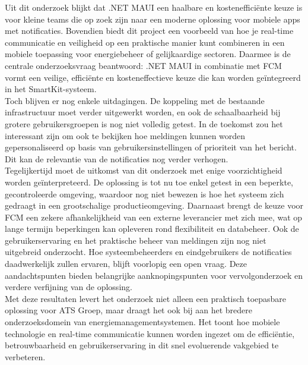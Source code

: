 Uit dit onderzoek blijkt dat .NET MAUI een haalbare en kostenefficiënte keuze is voor kleine teams die op zoek zijn naar een moderne oplossing voor mobiele apps met notificaties. Bovendien biedt dit project een voorbeeld van hoe je real-time communicatie en veiligheid op een praktische manier kunt combineren in een mobiele toepassing voor energiebeheer of gelijkaardige sectoren. Daarmee is de centrale onderzoeksvraag beantwoord: .NET MAUI in combinatie met FCM vormt een veilige, efficiënte en kosteneffectieve keuze die kan worden geïntegreerd in het SmartKit-systeem.\\

Toch blijven er nog enkele uitdagingen. De koppeling met de bestaande infrastructuur moet verder uitgewerkt worden, en ook de schaalbaarheid bij grotere gebruikersgroepen is nog niet volledig getest. In de toekomst zou het interessant zijn om ook te bekijken hoe meldingen kunnen worden gepersonaliseerd op basis van gebruikersinstellingen of prioriteit van het bericht. Dit kan de relevantie van de notificaties nog verder verhogen.\\

Tegelijkertijd moet de uitkomst van dit onderzoek met enige voorzichtigheid worden geïnterpreteerd. De oplossing is tot nu toe enkel getest in een beperkte, gecontroleerde omgeving, waardoor nog niet bewezen is hoe het systeem zich gedraagt in een grootschalige productieomgeving. Daarnaast brengt de keuze voor FCM een zekere afhankelijkheid van een externe leverancier met zich mee, wat op lange termijn beperkingen kan opleveren rond flexibiliteit en databeheer. Ook de gebruikerservaring en het praktische beheer van meldingen zijn nog niet uitgebreid onderzocht. Hoe systeembeheerders en eindgebruikers de notificaties daadwerkelijk zullen ervaren, blijft voorlopig een open vraag. Deze aandachtspunten bieden belangrijke aanknopingspunten voor vervolgonderzoek en verdere verfijning van de oplossing.\\

Met deze resultaten levert het onderzoek niet alleen een praktisch toepasbare oplossing voor ATS Groep, maar draagt het ook bij aan het bredere onderzoeksdomein van energiemanagementsystemen. Het toont hoe mobiele technologie en real-time communicatie kunnen worden ingezet om de efficiëntie, betrouwbaarheid en gebruikerservaring in dit snel evoluerende vakgebied te verbeteren.



